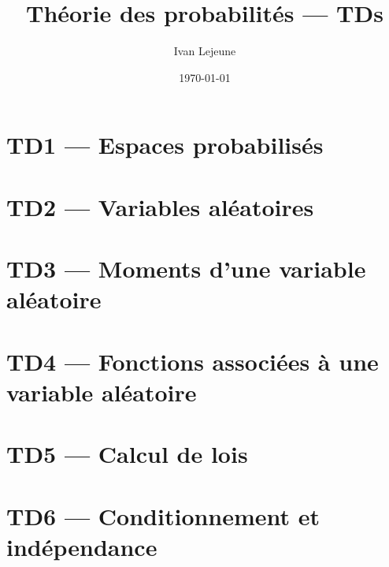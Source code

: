\documentclass[french,a4paper,10pt]{article}
\title{\color{astral} \sffamily \bfseries Théorie des probabilités --- TDs}
\author{Ivan Lejeune}
\date{\today}
\begin{document}
    \maketitle
    \tableofcontents
    
    \newpage
    \section*{TD1 --- Espaces probabilisés}\label{sec:TD1}
    \setcounter{section}{1}
    \setcounter{tdcounter}{0}
    

    \newpage
    \section*{TD2 --- Variables aléatoires}\label{sec:TD2}
    \setcounter{section}{2}
    \setcounter{tdcounter}{0}
    
    
    \newpage
    \section*{TD3 --- Moments d'une variable aléatoire}\label{sec:TD3}
    \setcounter{section}{3}
    \setcounter{tdcounter}{0}
    

    \newpage
    \section*{TD4 --- Fonctions associées à une variable aléatoire}\label{sec:TD4}
    \setcounter{section}{4}
    \setcounter{tdcounter}{0}
    

    \newpage
    \section*{TD5 --- Calcul de lois}\label{sec:TD5}
    \setcounter{section}{5}
    \setcounter{tdcounter}{0}
    

    \newpage
    \section*{TD6 --- Conditionnement et indépendance}\label{sec:TD6}
    \setcounter{section}{6}
    \setcounter{tdcounter}{0}
    
\end{document}
